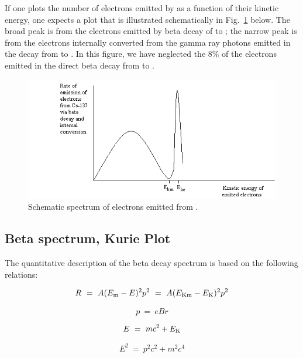 If one plots the number of electrons emitted by \cs as a function of their
kinetic energy, one expects a plot that is illustrated schematically in
Fig.~\ref{fig:Espectrum} below.  The broad peak is from the electrons emitted by
beta decay of \cs to \bam; the narrow peak is from the electrons internally
converted from the gamma ray photons emitted in the decay from \bam to \ba.  In
this figure, we have neglected the 8\% of the electrons emitted in the direct
beta decay from \cs to \ba.
\begin{figure}
\begin{centering}
\includegraphics[width=5in]{../images/beta-img2.png} 
\caption{Schematic spectrum of electrons emitted from \cs.}
\label{fig:Espectrum}
\end{centering}
\end{figure}

\subsection{Beta spectrum, Kurie Plot}

The quantitative description of the beta decay spectrum is based on the
following relations:

\begin{equation}
R~=~A(E_{\rm m} - E)^2p^2~=~A(E_{\rm Km} - E_{\rm K})^2p^2
\label{eq:1}
\end{equation}

\begin{equation}
p~=~e B r
\label{eq:2}
\end{equation}

\begin{equation}
E~=~mc^2 + E_{\rm K}
\label{eq:3}
\end{equation}

\begin{equation}
E^2~=~p^2c^2 + m^2c^4
\label{eq:4}
\end{equation}


